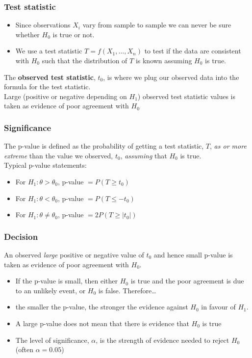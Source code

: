 \documentclass[a4paper]{article}\usepackage[]{graphicx}\usepackage[]{xcolor}
\begin{document}
\subsubsection{Test statistic}
\begin{itemize}
	\item Since observations \( X_i \) vary from sample to sample we can never be sure whether \( H_0 \) is true or not.
	\item We use a test statistic \( T = f(X_1,\dotsc,X_n) \) to test if the data are consistent with \( H_0 \) such that the distribution of \( T \) is known assuming \( H_0 \) is true.
\end{itemize}
The \textbf{observed test statistic}, \( t_0 \), is where we plug our observed data into the formula for the test statistic.\\
Large (positive or negative depending on \( H_1 \)) observed test statistic values is taken as evidence of poor agreement with \( H_0 \)
\subsubsection{Significance}
The p-value is defined as the probability of getting a test statistic, \( T \), \textit{as or more extreme} than the value we observed, \( t_0 \), \textit{assuming} that \( H_0 \) is true.\\
Typical p-value statements:
\begin{itemize}
	\item For \( H_1: \theta > \theta_0 \), p-value \( = P(T \geq t_0) \) 
	\item For \( H_1: \theta < \theta_0 \), p-value \( = P(T \leq -t_0) \) 
	\item For \( H_1: \theta \neq \theta_0 \), p-value \( = 2P(T \geq \lvert t_0 \rvert) \) 
\end{itemize}
\subsubsection{Decision}
An observed \textit{large} positive or negative value of \( t_0 \) and hence small p-value is taken as evidence of poor agreement with \( H_0 \).
\begin{itemize}
	\item If the p-value is small, then either \( H_0 \) is true and the poor agreement is due to an unlikely event, or \( H_0 \) is false. Therefore\dots
	\item the smaller the p-value, the stronger the evidence against \( H_0 \) in favour of \( H_1 \).
	\item A large p-value does not mean that there is evidence that \( H_0 \) is true
	\item The level of significance, \( \alpha \), is the strength of evidence needed to reject \( H_0 \) (often \( \alpha = 0.05 \))
\end{itemize}
\end{document}
